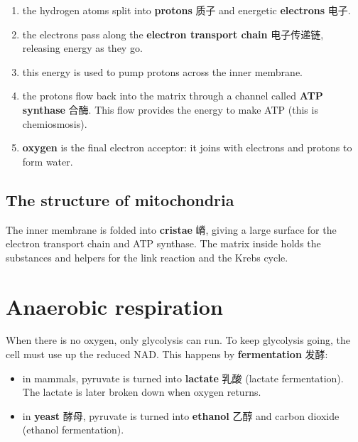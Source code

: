 \documentclass[11pt]{article}
\begin{document}
\begin{enumerate}
\item the hydrogen atoms split into \textbf{protons} 质子 and energetic \textbf{electrons} 电子.

\item the electrons pass along the \textbf{electron transport chain} 电子传递链, releasing energy as they go.

\item this energy is used to pump protons across the inner membrane.

\item the protons flow back into the matrix through a channel called \textbf{ATP synthase} 合酶. This flow provides the energy to make ATP (this is chemiosmosis).

\item \textbf{oxygen} is the final electron acceptor: it joins with electrons and protons to form water.

\end{enumerate}

\subsection*{The structure of mitochondria}

The inner membrane is folded into \textbf{cristae} 嵴, giving a large surface for the electron transport chain and ATP synthase. The matrix inside holds the substances and helpers for the link reaction and the Krebs cycle.

\section*{Anaerobic respiration}

When there is no oxygen, only glycolysis can run. To keep glycolysis going, the cell must use up the reduced NAD. This happens by \textbf{fermentation} 发酵:

\begin{itemize}
\item in mammals, pyruvate is turned into \textbf{lactate} 乳酸 (lactate fermentation). The lactate is later broken down when oxygen returns.

\item in \textbf{yeast} 酵母, pyruvate is turned into \textbf{ethanol} 乙醇 and carbon dioxide (ethanol fermentation).

\end{itemize}
\end{document}
